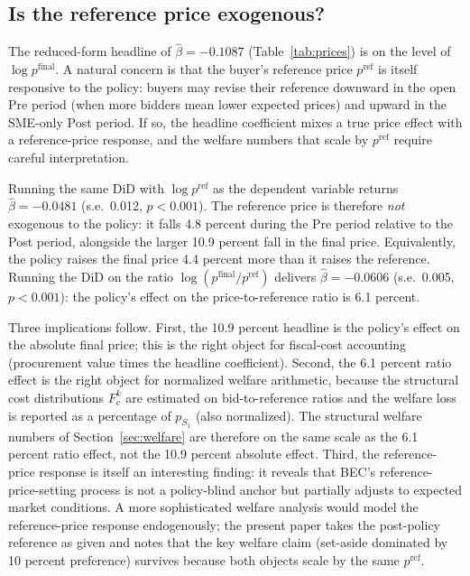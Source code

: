 \subsection{Is the reference price exogenous?}\label{sec:ref_endog}

The reduced-form headline of $\hat\beta = -0.1087$ (Table~\ref{tab:prices}) is on the level of $\log p^{\mathrm{final}}$. A natural concern is that the buyer's reference price $p^{\mathrm{ref}}$ is itself responsive to the policy: buyers may revise their reference downward in the open Pre period (when more bidders mean lower expected prices) and upward in the SME-only Post period. If so, the headline coefficient mixes a true price effect with a reference-price response, and the welfare numbers that scale by $p^{\mathrm{ref}}$ require careful interpretation.

Running the same DiD with $\log p^{\mathrm{ref}}$ as the dependent variable returns $\hat\beta = -0.0481$ (s.e.\ 0.012, $p < 0.001$). The reference price is therefore \emph{not} exogenous to the policy: it falls 4.8 percent during the Pre period relative to the Post period, alongside the larger 10.9 percent fall in the final price. Equivalently, the policy raises the final price 4.4 percent more than it raises the reference. Running the DiD on the ratio $\log(p^{\mathrm{final}} / p^{\mathrm{ref}})$ delivers $\hat\beta = -0.0606$ (s.e.\ 0.005, $p < 0.001$): the policy's effect on the price-to-reference ratio is 6.1 percent.

Three implications follow. First, the 10.9 percent headline is the policy's effect on the absolute final price; this is the right object for fiscal-cost accounting (procurement value times the headline coefficient). Second, the 6.1 percent ratio effect is the right object for normalized welfare arithmetic, because the structural cost distributions $F_c^k$ are estimated on bid-to-reference ratios and the welfare loss is reported as a percentage of $p_{S_1}$ (also normalized). The structural welfare numbers of Section~\ref{sec:welfare} are therefore on the same scale as the 6.1 percent ratio effect, not the 10.9 percent absolute effect. Third, the reference-price response is itself an interesting finding: it reveals that BEC's reference-price-setting process is not a policy-blind anchor but partially adjusts to expected market conditions. A more sophisticated welfare analysis would model the reference-price response endogenously; the present paper takes the post-policy reference as given and notes that the key welfare claim (set-aside dominated by 10 percent preference) survives because both objects scale by the same $p^{\mathrm{ref}}$.

